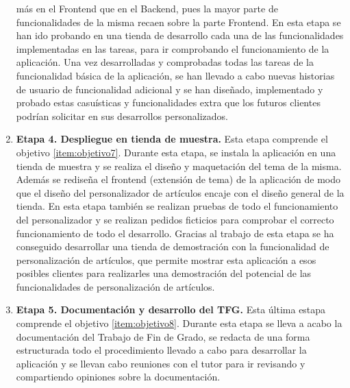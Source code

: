 \documentclass[12pt]{article}
\begin{document}
\begin{enumerate}[label={\textbf{\textbullet}}]
    más en el Frontend que en el Backend, pues la mayor parte de funcionalidades de la misma recaen sobre la parte Frontend. En esta etapa se han ido probando en una tienda de desarrollo cada una de las funcionalidades implementadas en las tareas, 
    para ir comprobando el funcionamiento de la aplicación. Una vez desarrolladas y comprobadas todas las tareas de la funcionalidad básica de la aplicación, se han llevado a cabo nuevas historias de usuario de funcionalidad adicional y se han diseñado, implementado y probado estas casuísticas y funcionalidades
    extra que los futuros clientes podrían solicitar en sus desarrollos personalizados.
    \item \textbf{Etapa 4. Despliegue en tienda de muestra.} Esta etapa comprende el objetivo \ref{item:objetivo7}. 
    Durante esta etapa, se instala la aplicación en una tienda de muestra y se realiza el diseño y maquetación del tema de la misma. Además se rediseña el frontend (extensión de tema) de la aplicación de modo que el diseño del personalizador de artículos
    encaje con el diseño general de la tienda. En esta etapa también se realizan pruebas de todo el funcionamiento del personalizador y se realizan pedidos ficticios para comprobar el correcto
    funcionamiento de todo el desarrollo. Gracias al trabajo de esta etapa se ha conseguido desarrollar una tienda de demostración con la funcionalidad de personalización de artículos, que permite
    mostrar esta aplicación a esos posibles clientes para realizarles una demostración del potencial de las funcionalidades de personalización de artículos.
    \item \textbf{Etapa 5. Documentación y desarrollo del TFG.} Esta última estapa comprende el objetivo \ref{item:objetivo8}. Durante esta etapa
    se lleva a acabo la documentación del Trabajo de Fin de Grado, se redacta de una forma estructurada todo el procedimiento llevado a cabo para desarrollar
    la aplicación y se llevan cabo reuniones con el tutor para ir revisando y compartiendo opiniones sobre la documentación.
\end{enumerate}
\end{document}
